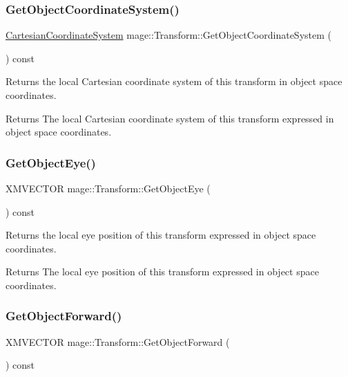 \subsubsection{\texorpdfstring{Get\+Object\+Coordinate\+System()}{GetObjectCoordinateSystem()}}
{\footnotesize\ttfamily \hyperlink{structmage_1_1_cartesian_coordinate_system}{Cartesian\+Coordinate\+System} mage\+::\+Transform\+::\+Get\+Object\+Coordinate\+System (\begin{DoxyParamCaption}{ }\end{DoxyParamCaption}) const}

Returns the local Cartesian coordinate system of this transform in object space coordinates.

\begin{DoxyReturn}{Returns}
The local Cartesian coordinate system of this transform expressed in object space coordinates. 
\end{DoxyReturn}
\hypertarget{structmage_1_1_transform_ac6808d885014b98c6920f8a770d3c7d4}{}\label{structmage_1_1_transform_ac6808d885014b98c6920f8a770d3c7d4} 
\subsubsection{\texorpdfstring{Get\+Object\+Eye()}{GetObjectEye()}}
{\footnotesize\ttfamily X\+M\+V\+E\+C\+T\+OR mage\+::\+Transform\+::\+Get\+Object\+Eye (\begin{DoxyParamCaption}{ }\end{DoxyParamCaption}) const}

Returns the local eye position of this transform expressed in object space coordinates.

\begin{DoxyReturn}{Returns}
The local eye position of this transform expressed in object space coordinates. 
\end{DoxyReturn}
\hypertarget{structmage_1_1_transform_affc4bcfe6ca76005db8676de867aede0}{}\label{structmage_1_1_transform_affc4bcfe6ca76005db8676de867aede0} 
\subsubsection{\texorpdfstring{Get\+Object\+Forward()}{GetObjectForward()}}
{\footnotesize\ttfamily X\+M\+V\+E\+C\+T\+OR mage\+::\+Transform\+::\+Get\+Object\+Forward (\begin{DoxyParamCaption}{ }\end{DoxyParamCaption}) const}

